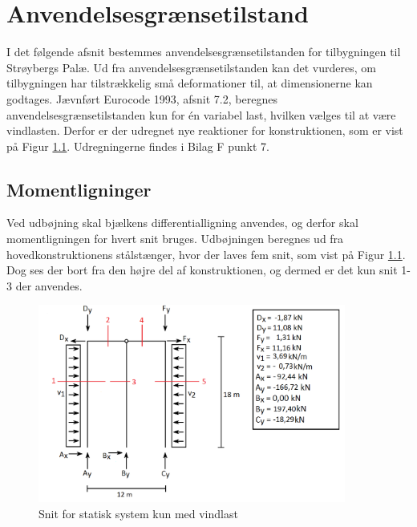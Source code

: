 \chapter{Anvendelsesgrænsetilstand}
I det følgende afsnit bestemmes anvendelsesgrænsetilstanden for tilbygningen til Strøybergs Palæ. Ud fra anvendelsesgrænsetilstanden kan det vurderes, om tilbygningen har tilstrækkelig små deformationer til, at dimensionerne kan godtages. 
\newline \indent{     }  Jævnført Eurocode 1993, afsnit 7.2, beregnes anvendelsesgrænsetilstanden kun for én variabel last, hvilken vælges til at være vindlasten. Derfor er der udregnet nye reaktioner for konstruktionen, som er vist på Figur \ref{fig:snitanvendelse}. Udregningerne findes i Bilag F punkt 7. 

\section{Momentligninger}
Ved udbøjning skal bjælkens differentialligning anvendes, og derfor skal momentligningen for hvert snit bruges. Udbøjningen beregnes ud fra hovedkonstruktionens stålstænger, hvor der laves fem snit, som vist på Figur \ref{fig:snitanvendelse}. Dog ses der bort fra den højre del af konstruktionen, og dermed er det kun snit 1-3 der anvendes.

\begin{figure}[H]
	\centering
	\includegraphics[width=0.9\textwidth]{billeder/snitanvendelse.png}
	\caption{Snit for statisk system kun med vindlast}
	\label{fig:snitanvendelse}
\end{figure}

